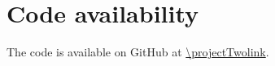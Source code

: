 





\section*{Code availability}
The code is available on GitHub at \url{\projectTwolink}.







